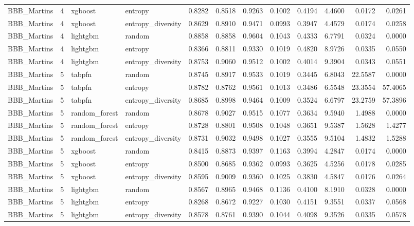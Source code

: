 \begin{tabular}{lrllrrrrrrrr}
BBB_Martins & 4 & xgboost & entropy & 0.8282 & 0.8518 & 0.9263 & 0.1002 & 0.4194 & 4.4600 & 0.0172 & 0.0261 \\
BBB_Martins & 4 & xgboost & entropy_diversity & 0.8629 & 0.8910 & 0.9471 & 0.0993 & 0.3947 & 4.4579 & 0.0174 & 0.0258 \\
BBB_Martins & 4 & lightgbm & random & 0.8858 & 0.8858 & 0.9604 & 0.1043 & 0.4333 & 6.7791 & 0.0324 & 0.0000 \\
BBB_Martins & 4 & lightgbm & entropy & 0.8366 & 0.8811 & 0.9330 & 0.1019 & 0.4820 & 8.9726 & 0.0335 & 0.0550 \\
BBB_Martins & 4 & lightgbm & entropy_diversity & 0.8753 & 0.9060 & 0.9512 & 0.1002 & 0.4014 & 9.3904 & 0.0343 & 0.0551 \\
BBB_Martins & 5 & tabpfn & random & 0.8745 & 0.8917 & 0.9533 & 0.1019 & 0.3445 & 6.8043 & 22.5587 & 0.0000 \\
BBB_Martins & 5 & tabpfn & entropy & 0.8782 & 0.8762 & 0.9561 & 0.1013 & 0.3486 & 6.5548 & 23.3554 & 57.4065 \\
BBB_Martins & 5 & tabpfn & entropy_diversity & 0.8685 & 0.8998 & 0.9464 & 0.1009 & 0.3524 & 6.6797 & 23.2759 & 57.3896 \\
BBB_Martins & 5 & random_forest & random & 0.8678 & 0.9027 & 0.9515 & 0.1077 & 0.3634 & 9.5940 & 1.4988 & 0.0000 \\
BBB_Martins & 5 & random_forest & entropy & 0.8728 & 0.8801 & 0.9508 & 0.1048 & 0.3651 & 9.5387 & 1.5628 & 1.4277 \\
BBB_Martins & 5 & random_forest & entropy_diversity & 0.8731 & 0.9032 & 0.9498 & 0.1027 & 0.3555 & 9.5104 & 1.4832 & 1.5288 \\
BBB_Martins & 5 & xgboost & random & 0.8415 & 0.8873 & 0.9397 & 0.1163 & 0.3994 & 4.2847 & 0.0174 & 0.0000 \\
BBB_Martins & 5 & xgboost & entropy & 0.8500 & 0.8685 & 0.9362 & 0.0993 & 0.3625 & 4.5256 & 0.0178 & 0.0285 \\
BBB_Martins & 5 & xgboost & entropy_diversity & 0.8595 & 0.9009 & 0.9360 & 0.1025 & 0.3830 & 4.5847 & 0.0176 & 0.0264 \\
BBB_Martins & 5 & lightgbm & random & 0.8567 & 0.8965 & 0.9468 & 0.1136 & 0.4100 & 8.1910 & 0.0328 & 0.0000 \\
BBB_Martins & 5 & lightgbm & entropy & 0.8268 & 0.8672 & 0.9227 & 0.1030 & 0.4151 & 9.3551 & 0.0337 & 0.0568 \\
BBB_Martins & 5 & lightgbm & entropy_diversity & 0.8578 & 0.8761 & 0.9390 & 0.1044 & 0.4098 & 9.3526 & 0.0335 & 0.0578 \\

\end{tabular}
